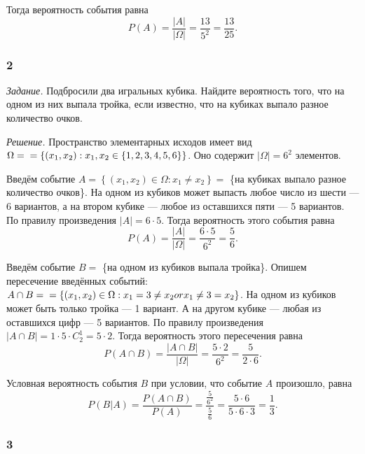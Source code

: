 Тогда вероятность события равна
$$P \left( A \right) =
\frac{ \left| A \right| }{ \left| \Omega \right| } =
\frac{13}{5^2} =
\frac{13}{25}.$$

\subsubsection*{2}

\textit{Задание.} Подбросили два игральных кубика.
Найдите вероятность того, что на одном из них выпала тройка, если известно, что на кубиках выпало разное количество очков.

\textit{Решение.}
Пространство элементарных исходов имеет вид $ \Omega =  \\
= \left\{ \left( x_1, x_2 \right): x_1, x_2 \in \left\{ 1, 2, 3, 4, 5, 6\right\} \right\} $.
Оно содержит $ \left| \Omega \right| = 6^2$ элементов.

Введём событие $A = \left\{ \left( x_1, x_2 \right) \in \Omega: x_1 \neq x_2 \right\} =$ \{на кубиках выпало разное количество очков\}.
На одном из кубиков может выпасть любое число из шести --- 6 вариантов, а на втором кубике --- любое из оставшихся пяти --- 5 вариантов.
По правилу произведения $ \left| A \right| = 6 \cdot 5$.
Тогда вероятность этого события равна
$$P \left( A \right) =
\frac{ \left| A \right| }{ \left| \Omega \right| } =
\frac{6 \cdot 5}{6^2} =
\frac{5}{6}.$$

Введём событие $B = $ \{на одном из кубиков выпала тройка\}.
Опишем пересечение введённых событий: $A \cap B =  \\
= \left\{ \left( x_1, x_2 \right) \in \Omega: x_1 = 3 \neq x_2 or x_1 \neq 3 = x_2 \right\} $.
На одном из кубиков может быть только тройка --- 1 вариант.
А на другом кубике --- любая из оставшихся цифр --- 5 вариантов.
По правилу произведения $ \left| A \cap B \right| = 1 \cdot 5 \cdot C_2^1 = 5 \cdot 2$.
Тогда вероятность этого пересечения равна
$$P \left( A \cap B \right) =
\frac{ \left| A \cap B \right| }{ \left| \Omega \right| } =
\frac{5 \cdot 2}{6^2} =
\frac{5}{2 \cdot 6}.$$

Условная вероятность события $B$ при условии, что событие $A$ произошло, равна
$$P \left( \left. B \right| A \right) =
\frac{P \left( A \cap B \right) }{P \left( A \right) } =
\frac{ \frac{5}{6^2} }{ \frac{5}{6} } =
\frac{5 \cdot 6}{5 \cdot 6 \cdot 3} =
\frac{1}{3}.$$

\subsubsection*{3}

